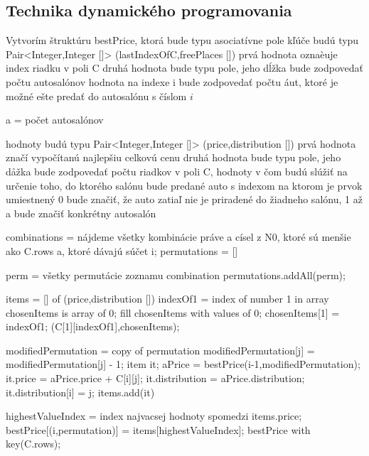 \documentclass[paper=a4, fontsize=11pt]{scrartcl} %
\numberwithin{equation}{section} %
\numberwithin{figure}{section} %
\numberwithin{table}{section} %
\begin{document}
\subsection*{Technika dynamického programovania}

Vytvorím štruktúru bestPrice, ktorá bude typu asociatívne pole
kľúče budú typu Pair<Integer,Integer []>
(lastIndexOfC,freePlaces [])
prvá hodnota oznaèuje index riadku v poli C
druhá hodnota bude typu pole, jeho dĺžka bude zodpovedať počtu autosalónov
hodnota na indexe i bude zodpovedať počtu áut, ktoré je možné ešte predať do autosalónu s číslom $i$

a = počet autosalónov

hodnoty budú typu Pair<Integer,Integer []>
(price,distribution [])
prvá hodnota značí vypočítanú najlepšiu celkovú cenu
druhá hodnota bude typu pole, jeho dåžka bude zodpovedať počtu riadkov v poli C,
hodnoty v čom budú slúžiť na určenie toho, do ktorého salónu bude predané auto s indexom na ktorom je prvok umiestnený
0 bude značiť, že auto zatiaľ nie je priradené do žiadneho salónu, 1 až a bude značiť konkrétny autosalón


\begin{algorithmic}[1]
        \State combinations = nájdeme všetky kombinácie práve a císel z N0, ktoré sú menšie ako C.rows a, ktoré dávajú súčet i;
        \State permutations = []
        
	    \State perm = všetky permutácie zoznamu combination
	    \State permutations.addAll(perm);
        \EndFor
		
            \State items = [] of (price,distribution [])
                \State indexOf1 = index of number 1 in array
                \State chosenItems is array of 0;
                \State fill chosenItems with values of 0;
                \State chosenItems[1] = indexOf1;
                \State \Return (C[1][indexOf1],chosenItems);
            \EndIf
            
                \State modifiedPermutation = copy of permutation
		    \State modifiedPermutation[j] = modifiedPermutation[j] - 1;
		    \State	item it;
		    \State aPrice = bestPrice(i-1,modifiedPermutation);
		    \State it.price = aPrice.price + C[i][j];
		    \State it.distribution = aPrice.distribution;
		    \State it.distribution[i] = j;
                    \State items.add(it)
                 \EndIf
            \EndFor			
		
            \State highestValueIndex = index najvacsej hodnoty spomedzi items.price;
            \State bestPrice[(i,permutation)] = items[highestValueIndex];		
        \EndFor
    \EndFor
    \State \Return bestPrice with key(C.rows);
\EndFunction
\end{algorithmic}
\end{document}
